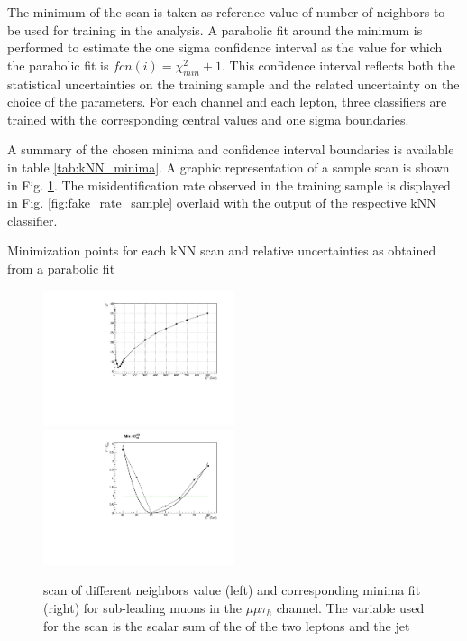 The minimum of the scan is taken as reference value of number of neighbors to be used for training in the analysis. A parabolic fit around the minimum is performed to estimate the one sigma confidence interval as the value for which the parabolic fit is $fcn(i) = \chi^2_{min} + 1$. This confidence interval reflects both the statistical uncertainties on the training sample and the related uncertainty on the choice of the parameters. For each channel and each lepton, three classifiers are trained with the corresponding central values and one sigma boundaries.

A summary of the chosen minima and confidence interval boundaries is available in table \ref{tab:kNN_minima}. A graphic representation of a sample scan is shown in Fig. \ref{fig:kNN_minima_sample}. The misidentification rate observed in the training sample is displayed in Fig. \ref{fig:fake_rate_sample} overlaid with the output of the respective kNN classifier.


\begin{table}


\caption{Minimization points for each kNN scan and relative uncertainties as obtained from a parabolic fit}
\label{tab:kNN_minima}
\end{table}

\begin{figure}
\includegraphics[width=0.5\textwidth]{4_Analisys/pics/8TeV/ProfileNeighbors/MM/h2taucuts020/LT_chi2.pdf}
\includegraphics[width=0.5\textwidth]{4_Analisys/pics/8TeV/ProfileNeighbors/MM/h2taucuts020_LT.pdf} \\
\caption{\chisq scan of different neighbors value (left) and corresponding minima fit (right) for sub-leading muons in the $\mu\mu\tau_h$ channel. The variable used for the scan is the scalar sum of the \pT of the two leptons and the jet}
\label{fig:kNN_minima_sample}
\end{figure}

